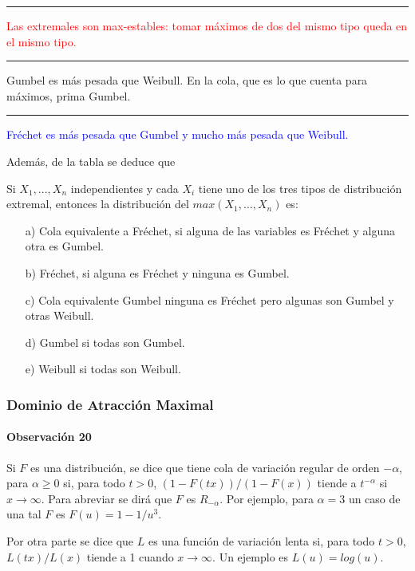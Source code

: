 \documentclass[
  12pt]{article}
\begin{document}
\textcolor{red}{\rule{1em}{1em} Las extremales son max-estables: tomar máximos de dos del mismo tipo queda en el mismo tipo.}

\textcolor[rgb]{0.0,0.5,0.0}{\rule{1em}{1em} Gumbel es más pesada que Weibull. En la cola, que es lo que cuenta para máximos, prima Gumbel.}

\textcolor{blue}{\rule{1em}{1em} Fréchet es más pesada que Gumbel y mucho más pesada que Weibull.}
\vspace{1cm}

Además, de la tabla se deduce que

\begin{theorem}
Si $X_1,...,X_n$ independientes y cada $X_i$ tiene uno de los tres tipos de distribución extremal, entonces la distribución del $max(X_1,...,X_n)$ es:
\begin{itemize}
\item[a)] Cola equivalente a Fréchet, si alguna de las variables es Fréchet y alguna otra es Gumbel.
\item[b)]  Fréchet, si alguna es Fréchet y ninguna es Gumbel.
\item[c)]  Cola equivalente Gumbel ninguna es Fréchet pero algunas son Gumbel y otras Weibull.
\item[d)] Gumbel si todas son Gumbel.
\item[e)]  Weibull si todas son Weibull.
\end{itemize}
\end{theorem}

\subsubsection*{Dominio de Atracción Maximal}

\paragraph*{Observación 20}

Si \(F\) es una distribución, se dice que tiene cola de variación
regular de orden \(-\alpha\), para \(\alpha \geq 0\) si, para todo
\(t>0\), \((1-F(tx))/(1-F(x))\) tiende a \(t^{-\alpha}\) si
\(x \rightarrow \infty\). Para abreviar se dirá que \(F\) es
\(R_{-\alpha}\). Por ejemplo, para \(\alpha=3\) un caso de una tal \(F\)
es \(F(u)=1- 1/u^3\).

Por otra parte se dice que \(L\) es una función de variación lenta si,
para todo \(t>0\), \(L(tx)/L(x)\) tiende a 1 cuando
\(x \rightarrow \infty\). Un ejemplo es \(L(u)=log(u)\).
\end{document}
